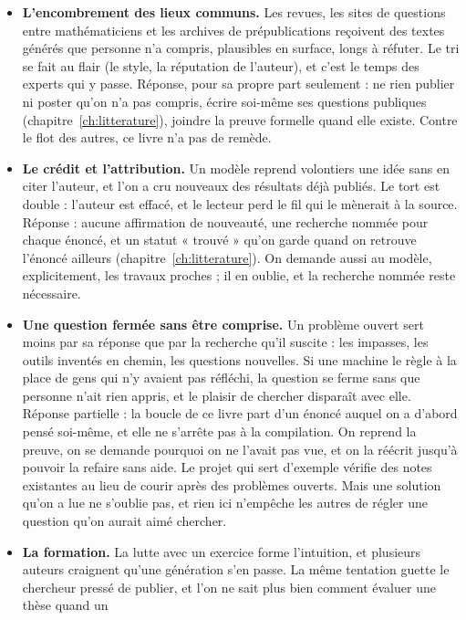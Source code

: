 \begin{itemize}
  \item \textbf{L'encombrement des lieux communs.} Les revues, les sites de questions entre
        mathématiciens et les archives de prépublications reçoivent des textes générés
        que personne n'a compris, plausibles en surface, longs à réfuter. Le tri se fait
        au flair (le style, la réputation de l'auteur), et c'est le temps des experts
        qui y passe. Réponse, pour sa propre part seulement : ne rien publier ni poster qu'on
        n'a pas compris, écrire soi-même ses questions publiques
        (chapitre~\ref{ch:litterature}), joindre la preuve formelle quand elle existe.
        Contre le flot des autres, ce livre n'a pas de remède.
  \item \textbf{Le crédit et l'attribution.} Un modèle reprend volontiers une idée sans en citer l'auteur,
        et l'on a cru nouveaux des résultats déjà publiés. Le tort est double : l'auteur est
        effacé, et le lecteur perd le fil qui le mènerait à la source.
        Réponse : aucune affirmation de nouveauté, une recherche nommée pour chaque
        énoncé, et un statut « trouvé » qu'on garde quand on retrouve l'énoncé ailleurs
        (chapitre~\ref{ch:litterature}). On demande aussi au modèle, explicitement, les
        travaux proches ; il en oublie, et la recherche nommée reste nécessaire.
  \item \textbf{Une question fermée sans être comprise.} Un problème ouvert sert moins par sa
        réponse que par la recherche qu'il suscite : les impasses, les outils inventés en
        chemin, les questions nouvelles. Si une machine le règle à la place de gens qui n'y
        avaient pas réfléchi, la question se ferme sans que personne n'ait rien appris, et
        le plaisir de chercher disparaît avec elle. Réponse partielle : la boucle de ce
        livre part d'un énoncé auquel on a d'abord pensé soi-même, et elle ne s'arrête
        pas à la compilation. On reprend la preuve, on se demande pourquoi on ne l'avait pas
        vue, et on la réécrit jusqu'à pouvoir la refaire sans aide. Le projet qui sert d'exemple vérifie
        des notes existantes au lieu de courir après des problèmes ouverts. Mais une
        solution qu'on a lue ne s'oublie pas, et rien ici n'empêche les autres de régler
        une question qu'on aurait aimé chercher.
  \item \textbf{La formation.} La lutte avec un exercice forme l'intuition, et plusieurs auteurs
        craignent qu'une génération s'en passe. La même tentation guette le chercheur
        pressé de publier, et l'on ne sait plus bien comment évaluer une thèse quand un

\end{itemize}
